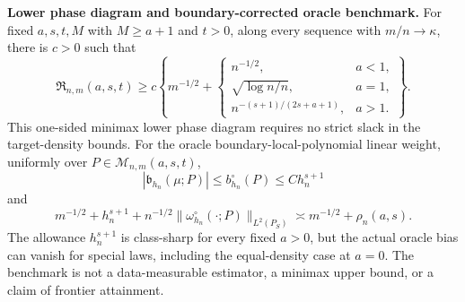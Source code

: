 \textbf{Lower phase diagram and boundary-corrected oracle benchmark.}
For fixed \(a,s,t,M\) with \(M\ge a+1\) and \(t>0\), along every sequence with \(m/n\to\kappa\), there is \(c>0\) such that
\[
\mathfrak R_{n,m}(a,s,t)\ge c\left\{m^{-1/2}+\begin{cases}
n^{-1/2},&a<1,\\
\sqrt{\log n/n},&a=1,\\
n^{-(s+1)/(2s+a+1)},&a>1.
\end{cases}\right\}.
\]
This one-sided minimax lower phase diagram requires no strict slack in the target-density bounds. For the oracle boundary-local-polynomial linear weight, uniformly over \(P\in\mathcal M_{n,m}(a,s,t)\),
\[
|\mathfrak b_{h_n}(\mu;P)|\le b_{h_n}^{\circ}(P)\le C h_n^{s+1}
\]
and
\[
m^{-1/2}+h_n^{s+1}
+n^{-1/2}\|\omega_{h_n}^{\circ}(\cdot;P)\|_{L^2(P_S)}
\asymp m^{-1/2}+\rho_n(a,s).
\]
The allowance \(h_n^{s+1}\) is class-sharp for every fixed \(a>0\), but the actual oracle bias can vanish for special laws, including the equal-density case at \(a=0\). The benchmark is not a data-measurable estimator, a minimax upper bound, or a claim of frontier attainment.